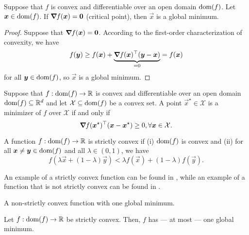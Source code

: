 \begin{lemma}
    Suppose that $f$ is convex and differentiable over an open domain $\mathrm{dom}(f)$. Let $\bm{x}\in\mathrm{dom}(f)$. If $\bm{\nabla}_{\! } f(\bm{x}) = \bm{0}$ (critical point), then $\vec{x}$ is a global minimum.
\end{lemma}

\begin{proof}
    Suppose that $\bm{\nabla}_{\! } f(\bm{x}) = \bm{0}$. According to the first-order characterization of convexity, we have \[
        f(\bm{y}) \geq f(\bm{x}) + \underbrace{\bm{\nabla}_{\! } f(\bm{x})^\top (\bm{y}-\bm{x})}_{=0} = f(\bm{x})
    \]
    for all $\bm{y} \in \mathrm{dom}(f)$, so $\vec{x}$ is a global minimum.
\end{proof}

\begin{lemma}
    \label{lem:optim}

    Suppose that $f: \mathrm{dom}(f) \to \mathbb{R}$ is convex and differentiable over an open domain $\mathrm{dom}(f)
        \subseteq \mathbb{R}^d$ and let $\mathcal{X} \subseteq \mathrm{dom}(f)$ be a convex set. A point $\vec{x}^\star \in
        \mathcal{X}$ is a minimizer of $f$ over $\mathcal{X}$ if and only if \[
        \bm{\nabla}_{\! } f(\bm{x}^\star)^\top(\bm{x} - \bm{x}^\star) \geq 0, \forall \bm{x} \in \mathcal{X}.
    \]
\end{lemma}

\begin{definition}
    A function $f: \mathrm{dom}(f)\to \mathbb{R}$ is strictly convex if (i) $\mathrm{dom}(f)$ is convex and (ii) for all $\bm{x} \neq \bm{y}\in \mathrm{dom}(f)$ and all $\lambda\in(0,1)$, we have \[
        f(\lambda \vec{x} + (1-\lambda) \vec{y}) < \lambda f(\vec{x}) + (1-\lambda) f(\vec{y}).
    \]
\end{definition}

An example of a strictly convex function can be found in , while an example of
a function that is not strictly convex can be found in .

\begin{marginfigure}
    \centering
    \caption{A non-strictly convex function with one global minimum.}
    \label{fig:non-strict-convexity}
\end{marginfigure}

\begin{lemma}
    Let $f: \mathrm{dom}(f) \to \mathbb{R}$ be strictly convex. Then, $f$ has --- at most --- one global minimum.
\end{lemma}

